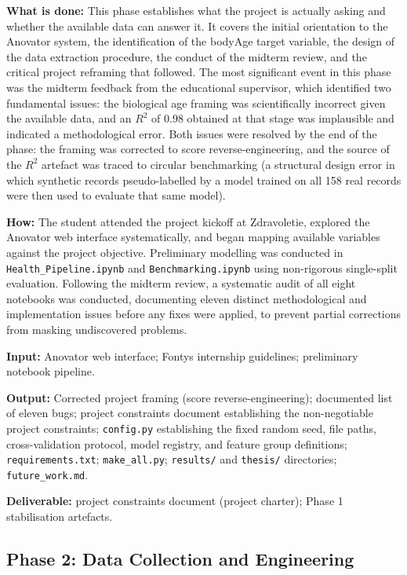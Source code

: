 \documentclass[11pt,a4paper]{article}
\begin{document}
\textbf{What is done:} This phase establishes what the project is actually asking and whether the available data can answer it. It covers the initial orientation to the Anovator system, the identification of the bodyAge target variable, the design of the data extraction procedure, the conduct of the midterm review, and the critical project reframing that followed. The most significant event in this phase was the midterm feedback from the educational supervisor, which identified two fundamental issues: the biological age framing was scientifically incorrect given the available data, and an $R^2$ of 0.98 obtained at that stage was implausible and indicated a methodological error. Both issues were resolved by the end of the phase: the framing was corrected to score reverse-engineering, and the source of the $R^2$ artefact was traced to circular benchmarking (a structural design error in which synthetic records pseudo-labelled by a model trained on all 158 real records were then used to evaluate that same model).

\textbf{How:} The student attended the project kickoff at Zdravoletie, explored the Anovator web interface systematically, and began mapping available variables against the project objective. Preliminary modelling was conducted in \texttt{Health\_Pipeline.ipynb} and \texttt{Benchmarking.ipynb} using non-rigorous single-split evaluation. Following the midterm review, a systematic audit of all eight notebooks was conducted, documenting eleven distinct methodological and implementation issues before any fixes were applied, to prevent partial corrections from masking undiscovered problems.

\textbf{Input:} Anovator web interface; Fontys internship guidelines; preliminary notebook pipeline.

\textbf{Output:} Corrected project framing (score reverse-engineering); documented list of eleven bugs; project constraints document establishing the non-negotiable project constraints; \texttt{config.py} establishing the fixed random seed, file paths, cross-validation protocol, model registry, and feature group definitions; \texttt{requirements.txt}; \texttt{make\_all.py}; \texttt{results/} and \texttt{thesis/} directories; \texttt{future\_work.md}.

\textbf{Deliverable:} project constraints document (project charter); Phase 1 stabilisation artefacts.

\subsection{Phase 2: Data Collection and Engineering}
\end{document}
